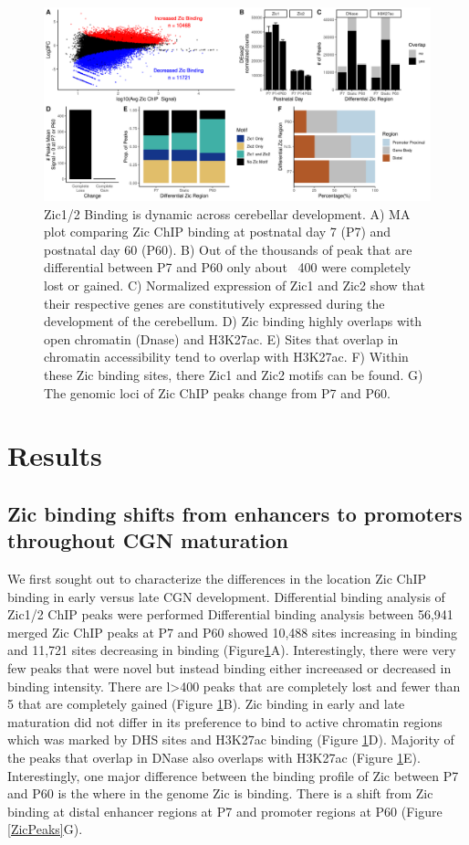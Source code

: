 \documentclass[fleqn,10pt,twocolumn]{wlscirep}
\begin{document}
\begin{figure}[ht]
\centering
\includegraphics[width=.95\textwidth]{../figures/figure1.png}
\caption{ Zic1/2 Binding is dynamic across cerebellar development. A) MA plot comparing Zic ChIP binding at postnatal day 7 (P7) and postnatal day 60 (P60). B) Out of the thousands of peak that are differential between P7 and P60 only about ~400 were completely lost or gained. C) Normalized expression of Zic1 and Zic2 show that their respective genes are constitutively expressed during the development of the cerebellum. D) Zic binding highly overlaps with open chromatin (Dnase) and H3K27ac. E) Sites that overlap in chromatin accessibility tend to overlap with H3K27ac. F) Within these Zic binding sites, there Zic1 and Zic2 motifs can be found. G) The genomic loci of Zic ChIP peaks change from P7 and P60. }
\label{fig:ZicPeaks}
\end{figure}


\section*{Results}
\subsection*{Zic binding shifts from enhancers to promoters throughout CGN maturation} 
We first sought out to characterize the differences in the location Zic ChIP binding in early versus late CGN development. Differential binding analysis of Zic1/2 ChIP peaks were performed Differential binding analysis between 56,941 merged Zic ChIP peaks at P7 and P60 showed  10,488 sites increasing in binding and 11,721 sites decreasing in binding (Figure\ref{fig:ZicPeaks}A). Interestingly, there were very few peaks that were novel but instead binding either increeased or decreased in binding intensity. There are l>400 peaks that are completely lost and fewer than 5 that are completely gained (Figure \ref{fig:ZicPeaks}B). Zic binding in early and late maturation did not differ in its preference to bind to active chromatin regions which was marked by DHS sites and H3K27ac binding (Figure \ref{fig:ZicPeaks}D). Majority of the peaks that overlap in DNase also overlaps with H3K27ac (Figure \ref{fig:ZicPeaks}E). Interestingly, one major difference between the binding profile of Zic between P7 and P60 is the where in the genome Zic is binding. There is a shift from Zic binding at distal enhancer regions at P7 and promoter regions at P60 (Figure \ref{ZicPeaks}G). 
\end{document}
